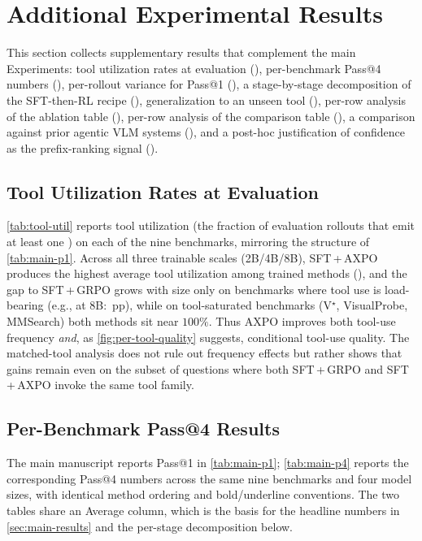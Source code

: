 \section{Additional Experimental Results}
\label{app:additional-results}

This section collects supplementary results that complement the main Experiments: tool utilization rates at evaluation (), per-benchmark Pass@4 numbers (), per-rollout variance for Pass@1 (), a stage-by-stage decomposition of the SFT-then-RL recipe (), generalization to an unseen tool (), per-row analysis of the ablation table (), per-row analysis of the comparison table (), a comparison against prior agentic VLM systems (), and a post-hoc justification of confidence as the prefix-ranking signal ().

\subsection{Tool Utilization Rates at Evaluation}
\label{app:tool-util}

\autoref{tab:tool-util} reports tool utilization (the fraction of evaluation rollouts that emit at least one \toolcall) on each of the nine benchmarks, mirroring the structure of \autoref{tab:main-p1}. Across all three trainable scales (2B/4B/8B), SFT\,+\,AXPO produces the highest average tool utilization among trained methods (\toolUtilAxpoAvg), and the gap to SFT\,+\,GRPO grows with size only on benchmarks where tool use is load-bearing (e.g., \toolUtilHardReasoning{} at 8B: \toolUtilHardReasoningGap\,pp), while on tool-saturated benchmarks (V$^{\star}$, VisualProbe, MMSearch) both methods sit near $100\%$. Thus AXPO improves both tool-use frequency \emph{and}, as \autoref{fig:per-tool-quality} suggests, conditional tool-use quality. The matched-tool analysis does not rule out frequency effects but rather shows that gains remain even on the subset of questions where both SFT\,+\,GRPO and SFT\,+\,AXPO invoke the same tool family.

\subsection{Per-Benchmark Pass@4 Results}
\label{app:pass4-table}

The main manuscript reports Pass@1 in \autoref{tab:main-p1}; \autoref{tab:main-p4} reports the corresponding Pass@4 numbers across the same nine benchmarks and four model sizes, with identical method ordering and bold/underline conventions. The two tables share an Average column, which is the basis for the headline numbers in \autoref{sec:main-results} and the per-stage decomposition below.

